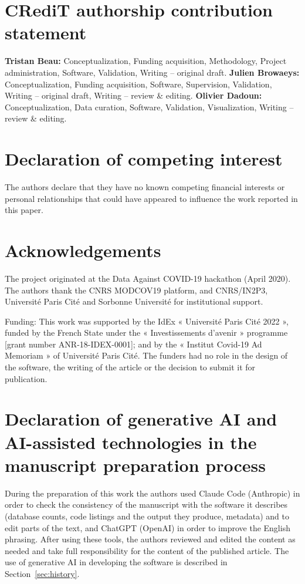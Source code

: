 \documentclass[preprint,12pt,a4paper]{elsarticle}
\begin{document}
\section*{CRediT authorship contribution statement}

\textbf{Tristan Beau:} Conceptualization, Funding acquisition, Methodology, Project administration, Software, Validation, Writing -- original draft.
\textbf{Julien Browaeys:} Conceptualization, Funding acquisition, Software, Supervision, Validation, Writing -- original draft, Writing -- review \& editing.
\textbf{Olivier Dadoun:} Conceptualization, Data curation, Software, Validation, Visualization, Writing -- review \& editing.

\section*{Declaration of competing interest}

The authors declare that they have no known competing financial interests or
personal relationships that could have appeared to influence the work reported
in this paper.

\section*{Acknowledgements}
\label{sec:acknowledgements}

The project originated at the Data Against COVID-19 hackathon (April 2020).
The authors thank the CNRS MODCOV19 platform, and CNRS/\allowbreak IN2P3, Université Paris
Cité and Sorbonne Université for institutional support.

Funding: This work was supported by the IdEx « Université Paris Cité 2022 »,
funded by the French State under the « Investissements d'avenir » programme
[grant number ANR-18-IDEX-0001]; and by the « Institut Covid-19 Ad Memoriam »
of Université Paris Cité. The funders had no role in the design of the
software, the writing of the article or the decision to submit it for
publication.

\section*{Declaration of generative AI and AI-assisted technologies in the manuscript preparation process}

During the preparation of this work the authors used Claude Code (Anthropic) in order to check the consistency of the manuscript with
the software it describes (database counts, code listings and the output they
produce, metadata) and to edit parts of the text, and ChatGPT (OpenAI) in order
to improve the English phrasing. After using these tools, the authors reviewed
and edited the content as needed and take full responsibility for the content
of the published article. The use of generative AI in developing the software
is described in Section~\ref{sec:history}.
\end{document}
